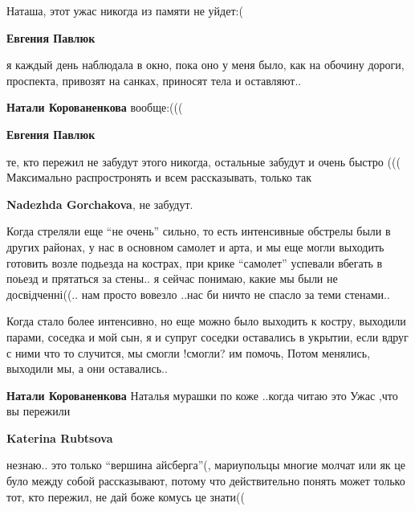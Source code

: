  
 
 
 
 

\qqSecCmt


Наташа, этот ужас никогда из памяти не уйдет:(

\begin{itemize} %
\textbf{Евгения Павлюк} 

я каждый день наблюдала в окно, пока оно у меня было, как на обочину дороги,
проспекта, привозят на санках, приносят тела и оставляют..

\textbf{Натали Корованенкова} вообще:(((

\textbf{Евгения Павлюк} 

те, кто пережил не забудут этого никогда, остальные забудут и очень быстро (((
Максимально распростронять и всем рассказывать, только так

\textbf{Nadezhda Gorchakova}, не забудут.

\end{itemize} %


Когда стреляли еще \enquote{не очень} сильно, то есть интенсивные обстрелы были в других
районах, у нас в основном самолет и арта, и мы еще могли выходить готовить
возле подьезда на кострах, при крике \enquote{самолет} успевали вбегать в поьезд и
прятаться за стены.. я сейчас понимаю, какие мы были не досвідченні((.. нам
просто вовезло ..нас би ничто не спасло за теми стенами..

Когда стало более интенсивно, но еще можно было выходить к костру, выходили
парами, соседка и мой сын, я и супруг соседки оставались в укрытии, если вдруг
с ними что то случится, мы смогли !смогли? им помочь, Потом менялись, выходили
мы, а они оставались..

\begin{itemize} %
\textbf{Натали Корованенкова} Наталья мурашки по коже ..когда читаю это
Ужас ,что вы пережили

\textbf{Katerina Rubtsova} 

незнаю.. это только \enquote{вершина айсберга}(, мариупольцы многие молчат или як це
було между собой рассказывают, потому что действительно понять может только
тот, кто пережил, не дай боже комусь це знати((

\end{itemize} %

